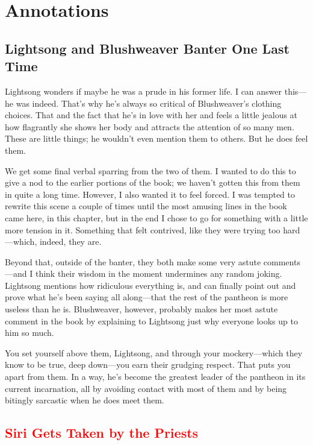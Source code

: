 \section*{Annotations}

\subsection*{Lightsong and Blushweaver Banter One Last Time}

Lightsong wonders if maybe he was a prude in his former life. I can answer this—he was indeed. That’s why he’s always so critical of Blushweaver’s clothing choices. That and the fact that he’s in love with her and feels a little jealous at how flagrantly she shows her body and attracts the attention of so many men. These are little things; he wouldn’t even mention them to others. But he does feel them.

We get some final verbal sparring from the two of them. I wanted to do this to give a nod to the earlier portions of the book; we haven’t gotten this from them in quite a long time. However, I also wanted it to feel forced. I was tempted to rewrite this scene a couple of times until the most amusing lines in the book came here, in this chapter, but in the end I chose to go for something with a little more tension in it. Something that felt contrived, like they were trying too hard—which, indeed, they are.

Beyond that, outside of the banter, they both make some very astute comments—and I think their wisdom in the moment undermines any random joking. Lightsong mentions how ridiculous everything is, and can finally point out and prove what he’s been saying all along—that the rest of the pantheon is more useless than he is. Blushweaver, however, probably makes her most astute comment in the book by explaining to Lightsong just why everyone looks up to him so much.

You set yourself above them, Lightsong, and through your mockery—which they know to be true, deep down—you earn their grudging respect. That puts you apart from them. In a way, he’s become the greatest leader of the pantheon in its current incarnation, all by avoiding contact with most of them and by being bitingly sarcastic when he does meet them.

\textcolor{red}{
\subsection*{Siri Gets Taken by the Priests}
}

